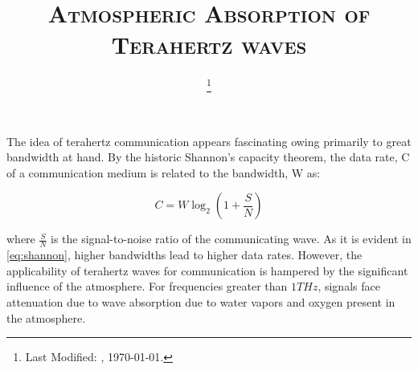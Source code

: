 \documentclass{article}
\begin{document}
  \title{\textsc{Atmospheric Absorption of Terahertz waves}\\}
  \date{\footnote{Last Modified: \currenttime, \today.}}
  \maketitle

  The idea of terahertz communication appears fascinating owing primarily to great bandwidth at hand. By the historic Shannon's capacity theorem, \cite{shannon1949communication} the data rate, C of a communication medium is related to the bandwidth, W as:

  \begin{equation}
    C = W \log_2 \left( 1 + \frac{S}{N} \right )
    \label{eq:shannon}
  \end{equation}

  where $\frac{S}{N}$ is the signal-to-noise ratio of the communicating wave. As it is evident in \ref{eq:shannon}, higher bandwidths lead to higher data rates. However, the applicability of terahertz waves for communication is hampered by the significant influence of the atmosphere. For frequencies greater than $ 1 THz$, signals face attenuation due to wave absorption due to water vapors and oxygen present in the atmosphere. \cite{danylov2006thz}

  
  


  
\end{document}
